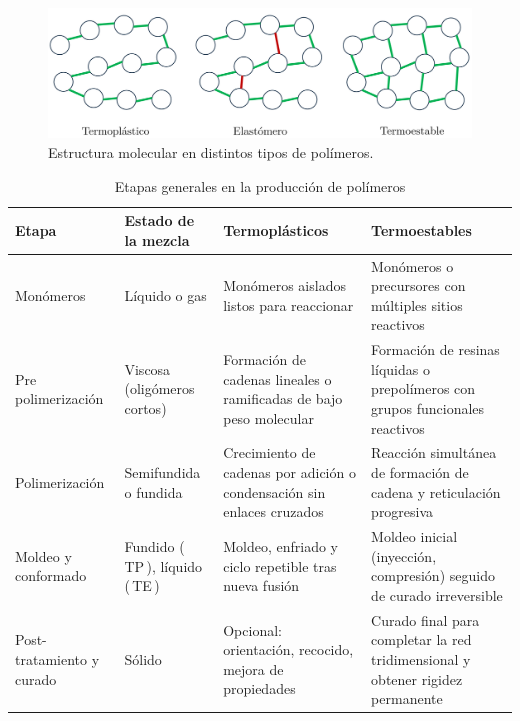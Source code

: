 \begin{figure}[h!]
    \centering
    \includegraphics[width=1.0\linewidth]{imgs/elastomer.png}
    \caption{Estructura molecular en distintos tipos de polímeros.}
    \label{plmrs}
\end{figure}

\begin{table}[h]
  \centering
  \caption{Etapas generales en la producción de polímeros}
  \label{tab:etapas_polimeros}
  \begin{tabular}{|P{2.5cm}|P{3.5cm}|P{4cm}|P{4.5cm}|}
    \hline
    \textbf{Etapa}            & \textbf{Estado de la mezcla}        & \textbf{Termoplásticos}                                                    & \textbf{Termoestables}                                                        \\ \hline
    Monómeros                 & Líquido o gas                       & Monómeros aislados listos para reaccionar                                   & Monómeros o precursores con múltiples sitios reactivos                         \\ \hline
    Pre polimerización         & Viscosa (oligómeros cortos)         & Formación de cadenas lineales o ramificadas de bajo peso molecular & Formación de resinas líquidas o prepolímeros con grupos funcionales reactivos   \\ \hline
    Polimerización            & Semifundida o fundida               & Crecimiento de cadenas por adición o condensación sin enlaces cruzados       & Reacción simultánea de formación de cadena y reticulación progresiva            \\ \hline
    Moldeo y conformado       & Fundido (\,TP\,), líquido (\,TE\,)  & Moldeo, enfriado y ciclo repetible tras nueva fusión                         & Moldeo inicial (inyección, compresión) seguido de curado irreversible          \\ \hline
    Post-tratamiento y curado & Sólido                              & Opcional: orientación, recocido, mejora de propiedades                      & Curado final para completar la red tridimensional y obtener rigidez permanente  \\ \hline
  \end{tabular}
\end{table}

